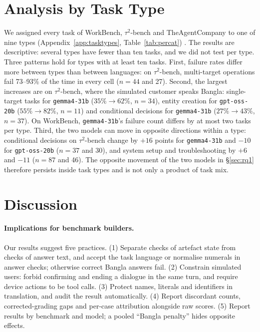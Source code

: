\documentclass[11pt]{article}
\newif\ifshowverify
\newcommand{\verify}[1]{\ifshowverify{\color{red}\,[VERIFY: #1]}\fi}
\newcommand{\gemma}{\texttt{gemma4-31b}}
\newcommand{\gptoss}{\texttt{gpt-oss-20b}}
\newcommand{\WB}{WorkBench}
\newcommand{\TAU}{$\tau^2$-bench}
\newcommand{\TAC}{TheAgentCompany}
\begin{document}
\section{Analysis by Task Type}
\label{sec:tasktypes}

We assigned every task of \WB{}, \TAU{} and \TAC{} to one of nine types (Appendix~\ref{app:tasktypes},
Table~\ref{tab:percat}) \verify{who assigned types and how}. The results are descriptive: several
types have fewer than ten tasks, and we did not test per type. Three patterns hold for types with
at least ten tasks. First, failure rates differ more between types than between languages: on
\TAU{}, multi-target operations fail 73--93\% of the time in every cell ($n=44$ and 27). Second,
the largest increases are on \TAU{}, where the simulated customer speaks Bangla: single-target
tasks for \gemma{} ($35\%\to62\%$, $n=34$), entity creation for \gptoss{} ($55\%\to82\%$, $n=11$)
and conditional decisions for \gemma{} ($27\%\to43\%$, $n=37$). On \WB{}, \gemma{}'s failure
count differs by at most two tasks per type. Third, the two models can move in opposite directions
within a type: conditional decisions on \TAU{} change by $+16$ points for \gemma{} and $-10$ for
\gptoss{} ($n=37$ and 30), and system setup and troubleshooting by $+6$ and $-11$ ($n=87$ and
46). The opposite movement of the two models in \S\ref{sec:rq1} therefore persists inside task
types and is not only a product of task mix.

\section{Discussion}
\label{sec:discussion}

\paragraph{Implications for benchmark builders.} Our results suggest five practices.
(1) Separate checks of artefact state from checks of answer text, and accept the task language
or normalise numerals in answer checks; otherwise correct Bangla answers fail. (2) Constrain
simulated users: forbid confirming and ending a dialogue in the same turn, and require device
actions to be tool calls. (3) Protect names, literals and identifiers in translation, and audit
the result automatically. (4) Report discordant counts, corrected-grading gaps and per-case
attribution alongside raw scores. (5) Report results by benchmark and model; a pooled ``Bangla
penalty'' hides opposite effects.
\end{document}
